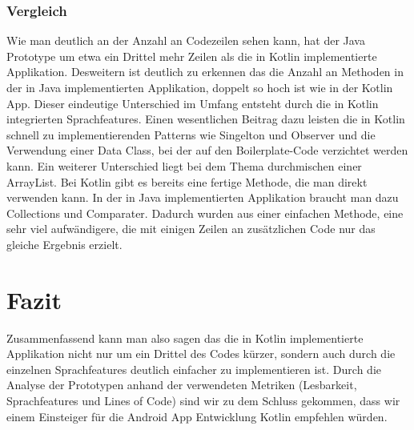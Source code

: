 \documentclass{sigchi-ext}
\begin{document}
\subsubsection{Vergleich}
Wie man deutlich an der Anzahl an Codezeilen sehen kann, hat der Java Prototype um etwa ein Drittel mehr Zeilen als die in Kotlin implementierte Applikation. Desweitern ist deutlich zu erkennen das die Anzahl an Methoden in der in Java implementierten Applikation, doppelt so hoch ist wie in der Kotlin App.
Dieser eindeutige Unterschied im Umfang entsteht durch die in Kotlin integrierten Sprachfeatures. Einen wesentlichen Beitrag dazu leisten die in Kotlin schnell zu implementierenden Patterns wie Singelton und Observer und die Verwendung einer Data Class, bei der auf den Boilerplate-Code verzichtet werden kann.
Ein weiterer Unterschied liegt bei dem Thema durchmischen einer ArrayList. Bei Kotlin gibt es bereits eine fertige Methode, die man direkt verwenden kann. In der in Java implementierten Applikation braucht man dazu Collections und Comparater. Dadurch wurden aus einer einfachen Methode, eine sehr viel aufwändigere, die mit einigen Zeilen an zusätzlichen Code nur das gleiche Ergebnis erzielt.

\section{Fazit}
Zusammenfassend kann man also sagen das die in Kotlin implementierte Applikation nicht nur um ein Drittel des Codes kürzer, sondern auch durch die einzelnen Sprachfeatures deutlich einfacher zu implementieren ist.
Durch die Analyse der Prototypen anhand der verwendeten Metriken (Lesbarkeit, Sprachfeatures und Lines of Code) sind wir zu dem Schluss gekommen, dass wir einem Einsteiger für die Android App Entwicklung Kotlin empfehlen würden.

\balance{} 



\end{document}
